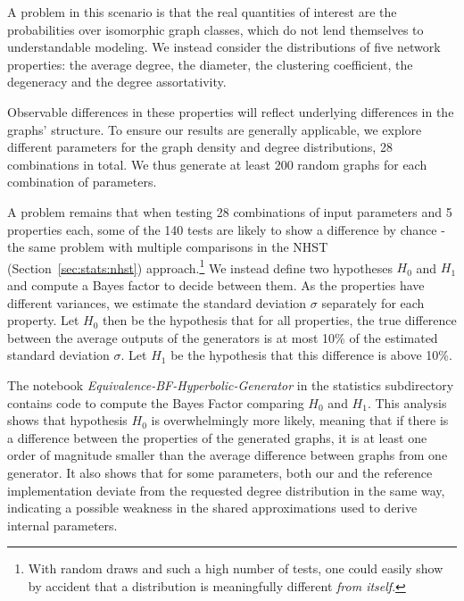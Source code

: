 \documentclass[algorithms,article,submit,moreauthors,pdftex]{Definitions/mdpi}
\newcommand{\changed}[1]{#1}
\begin{document}
\changed{
A problem in this scenario is that the real quantities of interest are the probabilities over isomorphic graph classes, which do not lend themselves to understandable modeling.
We instead consider the distributions of five network properties: the average degree, the diameter, the clustering coefficient, the degeneracy and the degree assortativity.}%

\changed{Observable differences in these properties will reflect underlying differences in the graphs' structure.
To ensure our results are generally applicable, we explore different parameters for the graph density and degree distributions, 28 combinations in total.
We thus generate at least 200 random graphs for each combination of parameters.
}

\changed{
A problem remains that when testing 28 combinations of input parameters and 5 properties each, some of the 140 tests are likely to show a difference by chance - the same problem with multiple comparisons in the NHST (Section~\ref{sec:stats:nhst}) approach.\footnote{With random draws and such a high number of tests, one could easily show by accident that a distribution is meaningfully different \emph{from itself}.}
We instead define two hypotheses $H_0$ and $H_1$ and compute a Bayes factor to decide between them.
As the properties have different variances, we estimate the standard deviation $\sigma$ separately for each property.
Let $H_0$ then be the hypothesis that for all properties, the true difference between the average outputs of the generators is at most 10\% of the estimated standard deviation $\sigma$.
Let $H_1$ be the hypothesis that this difference is above 10\%.
}

\changed{
The notebook \emph{Equivalence-BF-Hyperbolic-Generator} in the statistics subdirectory contains code to compute the Bayes Factor comparing $H_0$ and $H_1$.
This analysis shows that hypothesis $H_0$ is overwhelmingly more likely, meaning that if there is a difference between the properties of the generated graphs, it is at least one order of magnitude smaller than the average difference between graphs from one generator.
It also shows that for some parameters, both our and the reference implementation deviate from the requested degree distribution in the same way, indicating a possible weakness in the shared approximations used to derive internal parameters.
}
\end{document}
